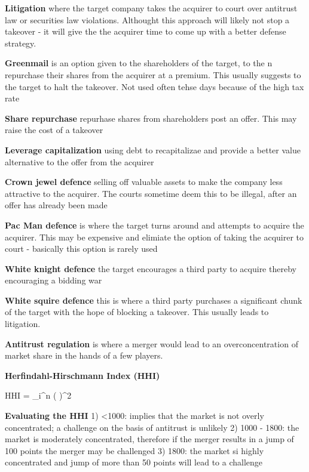 \documentclass[12pt]{article}
\begin{document}
			\textbf{Litigation} where the target company takes the acquirer to court over antitrust law or securities law violations. Althought this approach will likely not stop a takeover - it will give the the acquirer time to come up with a better defense strategy. 
			
			\textbf{Greenmail} is an option given to the shareholders of the target, to the n repurchase their shares from the acquirer at a premium. This usually suggests to the target to halt the takeover. Not used often tehse days because of the high tax rate
			
			\textbf{Share repurchase} repurhase shares from shareholders post an offer. This may raise the cost of a takeover 
			
			\textbf{Leverage capitalization} using debt to recapitalizae and provide a better value alternative to the offer from the acquirer
			
			\textbf{Crown jewel defence} selling off valuable assets to make the company less attractive to the acquirer. The courts sometime deem this to be illegal, after an offer has already been made
			
			\textbf{Pac Man defence} is where the target turns around and attempts to acquire the acquirer. This may be expensive and elimiate the option of taking the acquirer to court - basically this option is rarely used
			
			\textbf{White knight defence} the target encourages a third party to acquire thereby encouraging a bidding war
			
			\textbf{White squire defence} this is where a third party purchases a significant chunk of the target with the hope of blocking a takeover. This usually leads to litigation. 
			
			\textbf{Antitrust regulation} is where a merger would lead to an overconcentration of market share in the hands of a few players. 
			
			\textbf{Herfindahl-Hirschmann Index (HHI)}
			
			HHI = \sum_i^n \Biggr(   \Biggl)^2
			
			\textbf{Evaluating the HHI}
			1) <1000: implies that the market is not overly concentrated; a challenge on the basis of antitrust is unlikely
			2) 1000 - 1800: the market is moderately concentrated, therefore if the merger results in a jump of 100 points the merger may be challenged
			3) 1800: the market si highly concentrated and jump of more than 50 points will lead to a challenge
			
\end{document}
